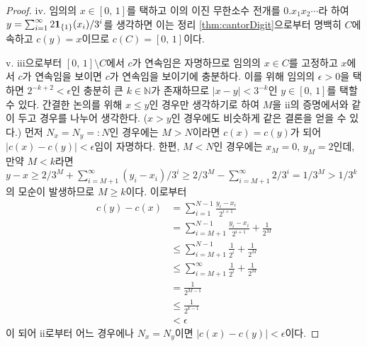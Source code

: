 \begin{proof}
    iv. 임의의 $x\in[0,\,1]$를 택하고 이의 이진 무한소수 전개를 $0.x_1x_2\cdots$라 하여 $y=\sum_{i=1}^\infty2\mathbf{1}_{\{1\}}(x_i)/3^i$를 생각하면 이는 정리 \ref{thm:cantorDigit}으로부터 명백히 $C$에 속하고 $c(y)=x$이므로 $c(C)=[0,\,1]$이다.

    v. iii으로부터 $[0,\,1]\setminus C$에서 $c$가 연속임은 자명하므로 임의의 $x\in C$를 고정하고 $x$에서 $c$가 연속임을 보이면 $c$가 연속임을 보이기에 충분하다. 이를 위해 임의의 $\epsilon>0$을 택하면 $2^{-k+2}<\epsilon$인 충분히 큰 $k\in\mathbb{N}$가 존재하므로 $|x-y|<3^{-k}$인 $y\in[0,\,1]$를 택할 수 있다. 간결한 논의를 위해 $x\leq y$인 경우만 생각하기로 하여 $M$을 ii의 증명에서와 같이 두고 경우를 나누어 생각한다. ($x>y$인 경우에도 비슷하게 같은 결론을 얻을 수 있다.) 먼저 $N_x=N_y=:N$인 경우에는 $M>N$이라면 $c(x)=c(y)$가 되어 $|c(x)-c(y)|<\epsilon$임이 자명하다. 한편, $M<N$인 경우에는 $x_M=0,\,y_M=2$인데, 만약 $M<k$라면 $y-x\geq2/3^M+\sum_{i=M+1}^\infty(y_i-x_i)/3^i\geq2/3^M-\sum_{i=M+1}^\infty2/3^i=1/3^M>1/3^k$의 모순이 발생하므로 $M\geq k$이다. 이로부터
    \begin{align*}
        c(y)-c(x)&=\sum_{i=1}^{N-1}\frac{y_i-x_i}{2^{i+1}}\\
        &=\sum_{i=M+1}^{N-1}\frac{y_i-x_i}{2^{i+1}}+\frac{1}{2^M}\\
        &\leq\sum_{i=M+1}^{N-1}\frac{1}{2^i}+\frac{1}{2^M}\\
        &\leq\sum_{i=M+1}^\infty\frac{1}{2^i}+\frac{1}{2^M}\\
        &=\frac{1}{2^{M-1}}\\
        &\leq\frac{1}{2^{k-1}}\\
        &<\epsilon
    \end{align*}
    이 되어 ii로부터 어느 경우에나 $N_x=N_y$이면 $|c(x)-c(y)|<\epsilon$이다.


\end{proof}
